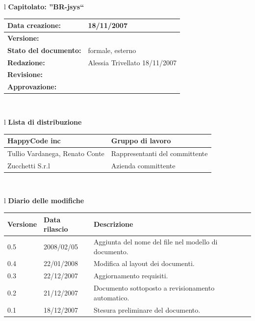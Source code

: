 \documentclass[11pt,titlepage,a4paper]{report}
\begin{document}
\begin{center}
\thispagestyle{plain}
\begin{table}[htbp]
\large{
\begin{tabular}{l}
\Large{\textbf{\textsf{Capitolato: ''BR-jsys``}}} \\
\begin{tabular}{||p{6cm}||p{6cm}||} \hline
\textbf{Data creazione:} & 18/11/2007 \\ \hline
\textbf{Versione:} & \lv \\ \hline
\textbf{Stato del documento:} & formale, esterno \\ \hline
\textbf{Redazione:} & Alessia Trivellato ­18/11/2007 \\ \hline
\textbf{Revisione:} &    \\ \hline
\textbf{Approvazione:}  & \\ \hline
\end{tabular} \\
\end{tabular}
}
\end{table}
\begin{table}[hbtp]
\large{
\begin{tabular}{l}
\Large{\textbf{\textsf{Lista di distribuzione}}} \\
\begin{tabular}{||p{6cm}||p{6cm}||} \hline
{HappyCode inc}& Gruppo di lavoro\\ \hline
{Tullio Vardanega, Renato Conte}& Rappresentanti del committente \\ \hline 
{Zucchetti S.r.l}& Azienda committente\\ \hline
\end{tabular} \\
\end{tabular}
}
\end{table}

\begin{table}[hbtp]
\large{
\begin{tabular}{l}
\Large{\textbf{\textsf{Diario delle modifiche}}} \\
\begin{tabular}{||p{2cm}||p{3.5cm}||p{6cm}||} \hline
\textbf{Versione} & \textbf{Data rilascio} & \textbf{Descrizione} \\ \hline
0.5 & 2008/02/05 & Aggiunta del nome del file nel modello di documento.\\ \hline
0.4 & 22/01/2008 & Modifica al layout dei documenti.\\ \hline
0.3 & 22/12/2007 & Aggiornamento requisiti. \\ \hline \hline
0.2 & 21/12/2007 & Documento sottoposto a revisionamento automatico.\\ \hline
0.1 & 18/12/2007 & Stesura preliminare del documento. \\ \hline


\end{tabular}
\end{tabular}}
\end{table}
\end{center}
\end{document}
